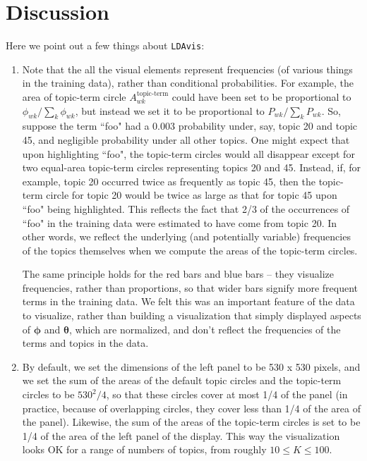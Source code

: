 \documentclass[12pt]{article}
\begin{document}
\section{Discussion}
Here we point out a few things about \texttt{LDAvis}:
\begin{enumerate}
\item Note that the all the visual elements represent frequencies (of various things in the training data), rather than conditional probabilities. For example, the area of topic-term circle $A^\text{topic-term}_{wk}$ could have been set to be proportional to $\phi_{wk}/\sum_k \phi_{wk}$, but instead we set it to be proportional to $P_{wk}/\sum_k P_{wk}$. So, suppose the term ``foo" had a 0.003 probability under, say, topic 20 and topic 45, and negligible probability under all other topics. One might expect that upon highlighting ``foo", the topic-term circles would all disappear except for two equal-area topic-term circles representing topics 20 and 45. Instead, if, for example, topic 20 occurred twice as frequently as topic 45, then the topic-term circle for topic 20 would be twice as large as that for topic 45 upon ``foo" being highlighted. This reflects the fact that 2/3 of the occurrences of ``foo" in the training data were estimated to have come from topic 20. In other words, we reflect the underlying (and potentially variable) frequencies of the topics themselves when we compute the areas of the topic-term circles.

The same principle holds for the red bars and blue bars -- they visualize frequencies, rather than proportions, so that wider bars signify more frequent terms in the training data. We felt this was an important feature of the data to visualize, rather than building a visualization that simply displayed aspects of $\boldsymbol{\phi}$ and $\boldsymbol{\theta}$, which are normalized, and don't reflect the frequencies of the terms and topics in the data.

\item By default, we set the dimensions of the left panel to be 530 x 530 pixels, and we set the sum of the areas of the default topic circles and the topic-term circles to be $530^2/4$, so that these circles cover at most 1/4 of the panel (in practice, because of overlapping circles, they cover less than 1/4 of the area of the panel). Likewise, the sum of the areas of the topic-term circles is set to be 1/4 of the area of the left panel of the display. This way the visualization looks OK for a range of numbers of topics, from roughly $10 \leq K \leq 100$.


\end{enumerate}
\end{document}
